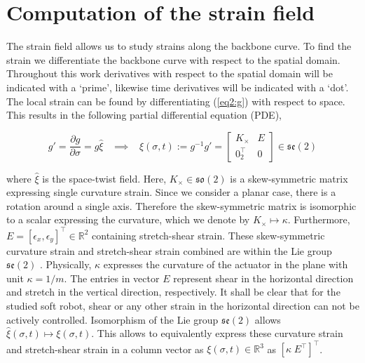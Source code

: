 \section{Computation of the strain field}

The strain field allows us to study strains along the backbone curve. To find the strain we differentiate the backbone curve with respect to the spatial domain. Throughout this work derivatives with respect to the spatial domain will be indicated with a `prime', likewise time derivatives will be indicated with a `dot'. The local strain can be found by differentiating (\ref{eq2:g}) with respect to space. This results in the following partial differential equation (PDE), 

\begin{equation}
   g' = \frac{\partial g}{\partial \sigma} = g \hat{\xi} \hspace{10pt} \implies \hspace{10pt}  \hat{\xi}(\sigma,t) := g^{-1}g' = \begin{bmatrix} K_\times & E \\ 0_2^\top & 0 \end{bmatrix} \in  \mathfrak{se}(2)
    \label{eq2:dgdsigma}
\end{equation}

where $\hat{\xi}$ is the space-twist field. Here, $K_\times \in \mathfrak{so}(2)$ is a skew-symmetric matrix expressing single curvature strain. Since we consider a planar case, there is a rotation around a single axis. Therefore the skew-symmetric matrix is isomorphic to a scalar expressing the curvature, which we denote by $K_\times \longmapsto \kappa$. Furthermore, $E = [\epsilon_x,\epsilon_y]^\top \in \mathbb{R}^2$ containing stretch-shear strain. These skew-symmetric curvature strain and stretch-shear strain combined are within the Lie group $\mathfrak{se}(2)$ \cite{Sola2018}. Physically, $\kappa$ expresses the curvature of the actuator in the plane with unit $\kappa = 1/m$. The entries in vector $E$ represent shear in the horizontal direction and stretch in the vertical direction, respectively. It shall be clear that for the studied soft robot, shear or any other strain in the horizontal direction can not be actively controlled. Isomorphism of the Lie group $\mathfrak{se}(2)$ allows $\hat{\xi}(\sigma,t) \longmapsto \xi(\sigma,t)$. This allows to equivalently express these curvature strain and stretch-shear strain in a column vector as $\xi(\sigma,t) \in \mathbb{R}^3$ as $[\kappa \hspace{3pt} E^\top ]^\top$.

